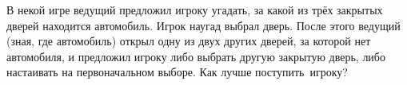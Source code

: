 \documentclass[a4paper,12pt]{article}
\begin{document}

В некой игре ведущий предложил игроку угадать,
за какой из тр\"ех закрытых дверей находится автомобиль.
Игрок наугад выбрал дверь. После этого ведущий
(зная, где автомобиль) открыл
одну из двух других дверей, за которой нет автомобиля, и предложил игроку либо
выбрать другую закрытую дверь,
либо настаивать на первоначальном выборе.
Как лучше поступить~игроку?






%
%

\end{document}
